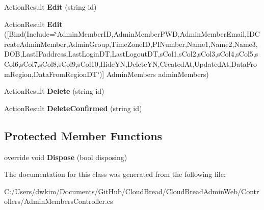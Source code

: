 \begin{DoxyCompactItemize}
\item 
Action\+Result {\bfseries Edit} (string id)\hypertarget{class_cloud_bread_admin_web_1_1_controllers_1_1_admin_members_controller_a6b5d0dd832c983f2d4cb72d9c00c0a85}{}\label{class_cloud_bread_admin_web_1_1_controllers_1_1_admin_members_controller_a6b5d0dd832c983f2d4cb72d9c00c0a85}

\item 
Action\+Result {\bfseries Edit} (\mbox{[}Bind(Include=\char`\"{}Admin\+Member\+ID,Admin\+Member\+P\+WD,Admin\+Member\+Email,I\+D\+Create\+Admin\+Member,Admin\+Group,Time\+Zone\+ID,P\+I\+Number,Name1,Name2,Name3,D\+OB,Last\+I\+Paddress,Last\+Login\+DT,Last\+Logout\+DT,s\+Col1,s\+Col2,s\+Col3,s\+Col4,s\+Col5,s\+Col6,s\+Col7,s\+Col8,s\+Col9,s\+Col10,Hide\+YN,Delete\+YN,Created\+At,Updated\+At,Data\+From\+Region,Data\+From\+Region\+DT\char`\"{})\mbox{]} Admin\+Members admin\+Members)\hypertarget{class_cloud_bread_admin_web_1_1_controllers_1_1_admin_members_controller_afadd578f1bb9f1ac39c8fdf194b7787f}{}\label{class_cloud_bread_admin_web_1_1_controllers_1_1_admin_members_controller_afadd578f1bb9f1ac39c8fdf194b7787f}

\item 
Action\+Result {\bfseries Delete} (string id)\hypertarget{class_cloud_bread_admin_web_1_1_controllers_1_1_admin_members_controller_a43024af377d48e0b3565d866e170923c}{}\label{class_cloud_bread_admin_web_1_1_controllers_1_1_admin_members_controller_a43024af377d48e0b3565d866e170923c}

\item 
Action\+Result {\bfseries Delete\+Confirmed} (string id)\hypertarget{class_cloud_bread_admin_web_1_1_controllers_1_1_admin_members_controller_a08adec6752aa78f11f627f17d52da9e1}{}\label{class_cloud_bread_admin_web_1_1_controllers_1_1_admin_members_controller_a08adec6752aa78f11f627f17d52da9e1}

\end{DoxyCompactItemize}
\subsection*{Protected Member Functions}
\begin{DoxyCompactItemize}
\item 
override void {\bfseries Dispose} (bool disposing)\hypertarget{class_cloud_bread_admin_web_1_1_controllers_1_1_admin_members_controller_a442b9a0fb19da8118b1c87ba48a5fe52}{}\label{class_cloud_bread_admin_web_1_1_controllers_1_1_admin_members_controller_a442b9a0fb19da8118b1c87ba48a5fe52}

\end{DoxyCompactItemize}


The documentation for this class was generated from the following file\+:\begin{DoxyCompactItemize}
\item 
C\+:/\+Users/dwkim/\+Documents/\+Git\+Hub/\+Cloud\+Bread/\+Cloud\+Bread\+Admin\+Web/\+Controllers/Admin\+Members\+Controller.\+cs\end{DoxyCompactItemize}
